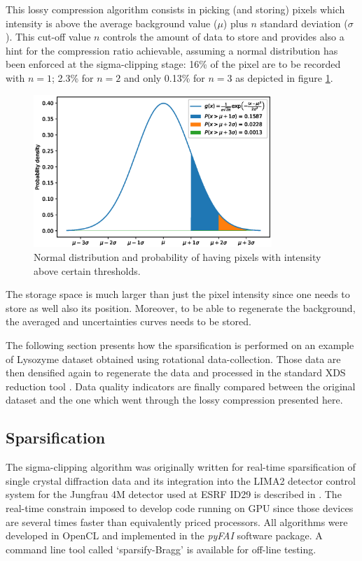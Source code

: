 \documentclass[a4paper,12pt,oneside]{article}              %
\begin{document}
This lossy compression algorithm consists in picking (and storing) pixels which intensity is above the average background value ($\mu$) plus $n$ standard deviation ($\sigma$). 
This cut-off value $n$ controls the amount of data to store and provides also a hint for the compression ratio achievable, assuming a normal distribution has been enforced at the sigma-clipping stage: 16\% of the pixel are to be recorded with $n=1$;  2.3\% for $n=2$ and only 0.13\% for $n=3$ as depicted in figure \ref{distribution}.
\begin{figure}
\label{distribution}
\begin{center}
\includegraphics[width=9cm]{distribution}
\caption{Normal distribution and probability of having pixels with intensity above certain thresholds.}
\end{center}
\end{figure}

The storage space is much larger than just the pixel intensity since one needs to store as well also its position. 
Moreover, to be able to regenerate the background, the averaged and uncertainties curves needs to be stored.

The following section presents how the sparsification is performed on an example of Lysozyme dataset obtained using rotational data-collection.
Those data are then densified again to regenerate the data and processed in the standard XDS reduction tool \cite{xds}.
Data quality indicators are finally compared between the original dataset and the one which went through the lossy compression presented here.

\subsection{Sparsification}

The sigma-clipping algorithm was originally written for real-time sparsification of single crystal diffraction data and its integration into the LIMA2 \cite{lima} detector control system for the Jungfrau 4M detector used at ESRF ID29 is described in \cite{sri2021}.
The real-time constrain imposed to develop code running on GPU since those devices are several times
faster than equivalently priced processors.
All algorithms were developed in OpenCL \cite{opencl_khronos} and implemented in the \textit{pyFAI} software package.
A command line tool called `sparsify-Bragg' is available for off-line testing.
\end{document}

